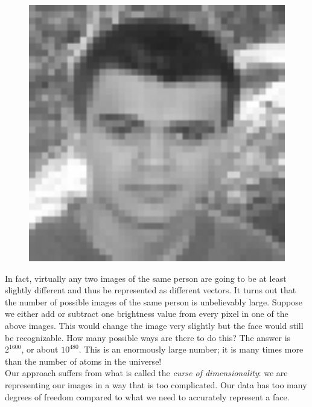 \begin{figure}[H]
\begin{minipage}[b]{0.2\textwidth}
	  \end{minipage}
	  \hspace{0.2cm}
	   \begin{minipage}[b]{0.2\textwidth}
	    \includegraphics[width=1.08\textwidth]{season3/304/images/face4.jpg}
	  \end{minipage}
	  \end{figure}
In fact, virtually any two images of the same person are going to be at least slightly different and thus be represented as different vectors. It turns out that the number of possible images of the same person is unbelievably large. Suppose we either add or subtract one brightness value from every pixel in one of the above images. This would change the image very slightly but the face would still be recognizable. How many possible ways are there to do this? The answer is $2^{1600}$, or about $10^{480}$. This is an enormously large number; it is many times more than the number of atoms in the universe! \\

Our approach suffers from what is called the \emph{curse of dimensionality}: we are representing our images in a way that is too complicated. Our data has too many degrees of freedom compared to what we need to accurately represent a face. \\

